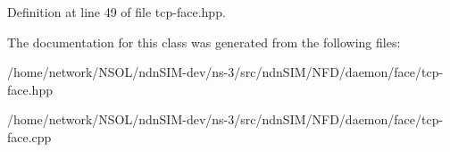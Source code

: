 Definition at line 49 of file tcp-\/face.\+hpp.



The documentation for this class was generated from the following files\+:\begin{DoxyCompactItemize}
\item 
/home/network/\+N\+S\+O\+L/ndn\+S\+I\+M-\/dev/ns-\/3/src/ndn\+S\+I\+M/\+N\+F\+D/daemon/face/tcp-\/face.\+hpp\item 
/home/network/\+N\+S\+O\+L/ndn\+S\+I\+M-\/dev/ns-\/3/src/ndn\+S\+I\+M/\+N\+F\+D/daemon/face/tcp-\/face.\+cpp\end{DoxyCompactItemize}
